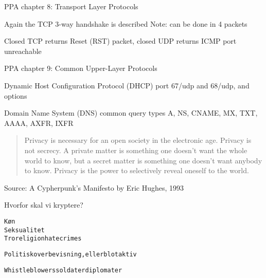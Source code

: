 \documentclass[Screen16to9,17pt]{foils}
\begin{document}


\begin{list1}
\item PPA chapter 8: Transport Layer Protocols
\begin{list2}
\item Again the TCP 3-way handshake is described Note: can be done in 4 packets
\item Closed TCP returns Reset (RST) packet, closed UDP returns ICMP port unreachable
\end{list2}
\end{list1}



\begin{list1}
\item PPA chapter 9: Common Upper-Layer Protocols
\begin{list2}
\item Dynamic Host Configuration Protocol (DHCP) port 67/udp and 68/udp, and options
\item Domain Name System (DNS) common query types A, NS, CNAME, MX, TXT, AAAA, AXFR, IXFR
\end{list2}
\end{list1}





\begin{quote}
	Privacy is necessary for an open society in the electronic age. Privacy is not secrecy. A private matter is something one doesn't want the whole world to know, but a secret matter is something one doesn't want anybody to know. Privacy is the power to selectively reveal oneself to the world.
\end{quote}
Source: A Cypherpunk's Manifesto by Eric Hughes, 1993


Hvorfor skal vi kryptere?

\begin{alltt}
       Køn
                       Seksualitet
 Tro religion       hatecrimes

 Politisk overbevisning, eller blot aktiv

 Whistleblowers             soldater      diplomater
\end{alltt}
\end{document}
